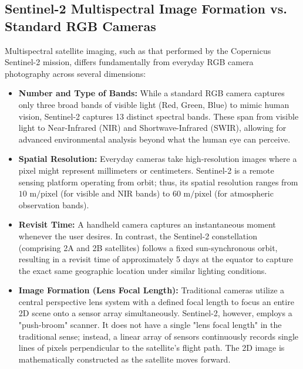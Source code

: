 \documentclass[12pt,a4paper]{article}
\begin{document}
\subsection{Sentinel-2 Multispectral Image Formation vs. Standard RGB Cameras}
Multispectral satellite imaging, such as that performed by the Copernicus Sentinel-2 mission, differs fundamentally from everyday RGB camera photography across several dimensions:

\begin{itemize}
    \item \textbf{Number and Type of Bands:} While a standard RGB camera captures only three broad bands of visible light (Red, Green, Blue) to mimic human vision, Sentinel-2 captures 13 distinct spectral bands. These span from visible light to Near-Infrared (NIR) and Shortwave-Infrared (SWIR), allowing for advanced environmental analysis beyond what the human eye can perceive.
    \item \textbf{Spatial Resolution:} Everyday cameras take high-resolution images where a pixel might represent millimeters or centimeters. Sentinel-2 is a remote sensing platform operating from orbit; thus, its spatial resolution ranges from $10\text{ m/pixel}$ (for visible and NIR bands) to $60\text{ m/pixel}$ (for atmospheric observation bands).
    \item \textbf{Revisit Time:} A handheld camera captures an instantaneous moment whenever the user desires. In contrast, the Sentinel-2 constellation (comprising 2A and 2B satellites) follows a fixed sun-synchronous orbit, resulting in a revisit time of approximately 5 days at the equator to capture the exact same geographic location under similar lighting conditions.
    \item \textbf{Image Formation (Lens Focal Length):} Traditional cameras utilize a central perspective lens system with a defined focal length to focus an entire 2D scene onto a sensor array simultaneously. Sentinel-2, however, employs a "push-broom" scanner. It does not have a single "lens focal length" in the traditional sense; instead, a linear array of sensors continuously records single lines of pixels perpendicular to the satellite's flight path. The 2D image is mathematically constructed as the satellite moves forward.
\end{itemize}
\end{document}
